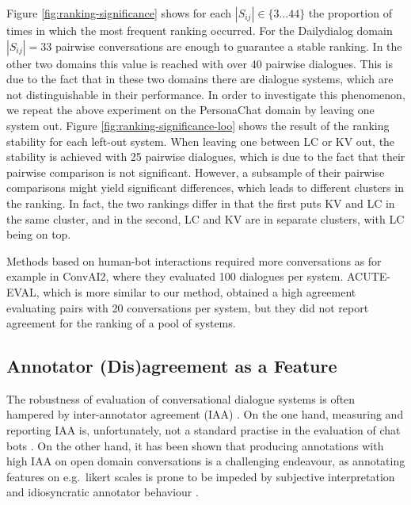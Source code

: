 \documentclass[11pt,a4paper]{article}
\begin{document}
Figure \ref{fig:ranking-significance} shows for each $|S_{ij}| \in \{3 ... 44\}$ the proportion of times in which the most frequent ranking occurred. For the Dailydialog domain $|S_{ij}| = 33$ pairwise conversations are enough to guarantee a stable ranking. In the other two domains this value is reached with over 40 pairwise dialogues. This is due to the fact that in these two domains there are dialogue systems, which are not distinguishable in their performance. In order to investigate this phenomenon, we repeat the above experiment on the PersonaChat domain by leaving one system out. Figure \ref{fig:ranking-significance-loo} shows the result of the ranking stability for each left-out system. When leaving one between LC or KV out, the stability is achieved with 25 pairwise dialogues, which is due to the fact that their pairwise comparison is not significant. However, a subsample of their pairwise comparisons might yield significant differences, which leads to different clusters in the ranking. In fact, the two rankings differ in that the first puts KV and LC in the same cluster, and in the second, LC and KV are in separate clusters, with LC being on top.

Methods based on human-bot interactions required more conversations as for example in ConvAI2, where they evaluated 100 dialogues per system.  ACUTE-EVAL, which is more similar to our method, obtained a high agreement evaluating pairs with 20 conversations per system, but they did not report agreement for the ranking of a pool of systems.

\subsection{Annotator (Dis)agreement as a Feature}
The robustness of evaluation of conversational dialogue systems is often hampered by inter-annotator agreement (IAA) \cite{gandhe2016semi}. %
On the one hand, measuring and reporting IAA is, unfortunately, not a standard practise in the evaluation of chat bots \cite{amidei2019agreement}. On the other hand, it has been shown that producing annotations with high IAA on open domain conversations is a challenging endeavour, as annotating features on e.g.\ likert scales is prone to be impeded by subjective interpretation and idiosyncratic annotator behaviour \cite{bishop2015use}.
\end{document}
